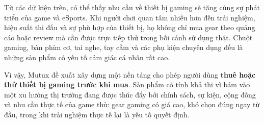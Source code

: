 Từ các dữ kiện trên, có thể thấy nhu cầu về thiết bị gaming sẽ tăng cùng sự phát triển của game và eSports. Khi người chơi quan tâm nhiều hơn đến trải nghiệm, hiệu suất thi đấu và sự phù hợp của thiết bị, họ không chỉ mua gear theo quảng cáo hoặc review mà cần được trực tiếp thử trong bối cảnh sử dụng thật. Chuột gaming, bàn phím cơ, tai nghe, tay cầm và các phụ kiện chuyên dụng đều là những sản phẩm có yếu tố cảm giác cá nhân rất cao.

Vì vậy, Mutux đề xuất xây dựng một nền tảng cho phép người dùng \textbf{thuê hoặc thử thiết bị gaming trước khi mua}. Sản phẩm có tính khả thi vì bám vào một xu hướng thị trường đang được thúc đẩy bởi chính sách, sự kiện, cộng đồng và nhu cầu thực tế của game thủ: gear gaming có giá cao, khó chọn đúng ngay từ đầu, trong khi trải nghiệm thực tế lại là yếu tố quyết định.

